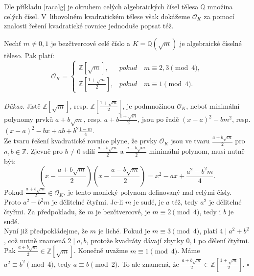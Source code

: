 \documentclass [12pt]{report}
\begin{document}
Dle příkladu \ref{racalg} je okruhem celých algebraických čísel tělesa $\mathbb{Q}$ množina celých čísel. V~libovolném kvadratickém tělese však dokážeme $\mathcal{O}_K$ za pomocí znalosti řešení kvadratické rovnice jednoduše popsat též.

 \begin{veta}\label{cela}
Nechť $m \neq 0,1$ je bezčtvercové celé číslo a $K = \mathbb{Q}(\sqrt{m})$ je algebraické číselné těleso. Pak platí:
\begin{equation*}
\mathcal{O}_K = \begin{cases}
      \mathbb{Z}[\sqrt{m}], & \textit{pokud} \quad  m \equiv 2,3 \pmod{4},\\
      \mathbb{Z}\left[\frac{1+\sqrt{m}}{2}\right], & \textit{pokud} \quad m \equiv 1 \pmod{4}.
    \end{cases}
\end{equation*}
\end{veta}

\noindent \textit{Důkaz.} Jistě $\mathbb{Z}[\sqrt{m}]$, resp. $\mathbb{Z}\left[\frac{1+\sqrt{m}}{2}\right]$, je podmnožinou $\mathcal{O}_K$, neboť minimální polynomy prvků $a+b\sqrt{m}$, resp. $a+b\frac{1+\sqrt{m}}{2}$, jsou po řadě $(x-a)^2 - b m^2$, resp. $(x-a)^2 - bx + ab + b^2 \frac{1-m}{4}$.\\

Ze tvaru řešení kvadratické rovnice plyne, že prvky $\mathcal{O}_K$ jsou ve tvaru $\frac{a+b\sqrt{m}}{2}$ pro $a,b \in \mathbb{Z}$. Zjevně pro $b \neq 0$ sdílí $\frac{a+b\sqrt{m}}{2}$ a $\frac{a-b\sqrt{m}}{2}$ minimální polynom, musí nutně být:
\begin{equation*}
\left(x - \frac{a+b\sqrt{m}}{2} \right)\left( x - \frac{a-b\sqrt{m}}{2}\right) = x^2 - ax + \frac{a^2 - b^2 m}{4}.
\end{equation*} 
Pokud $\frac{a+b\sqrt{m}}{2} \in \mathcal{O}_K$, je tento monický polynom definovaný nad celými čísly. Proto $a^2 - b^2 m$ je dělitelné čtyřmi. Je-li $m$ je sudé, je $a$ též, tedy $a^2 $ je dělitelné čtyřmi. Za předpokladu, že $m$ je bezčtvercové, je $m \equiv 2 \pmod{4}$, tedy i $b$ je sudé.\\

Nyní již předpokládejme, že $m$ je liché. Pokud je $m \equiv 3 \pmod{4}$, platí $4 \mid a^2 + b^2$, což nutně znamená $2 \mid a,b$, protože kvadráty dávají zbytky $0,1$ po dělení čtyřmi. Pak $\frac{a+b\sqrt{m}}{2} \in \mathbb{Z}[\sqrt{m}]$. Konečně uvažme $m \equiv 1 \pmod{4}$. Máme $a^2 \equiv b^2 \pmod{4}$, tedy $a \equiv b \pmod{2}$. To ale znamená, že $\frac{a+b\sqrt{m}}{2} \in \mathbb{Z}\left[\frac{1+\sqrt{m}}{2}\right]$. \hfill $\square$\\
\end{document}
